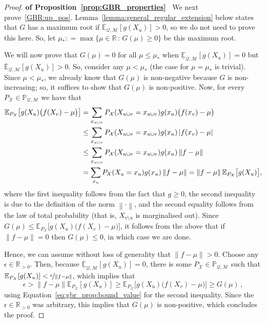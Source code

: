\documentclass[twoside,11pt]{article}
\newcommand{\reals}{\mathbb{R}}
\newcommand{\realspos}{\reals_{>0}}
\newcommand{\states}{\mathcal{X}}
\newcommand{\lexp}{\underline{\mathbb{E}}_{\rateset,\mathcal{M}}}
\newcommand{\uexp}{\overline{\mathbb{E}}_{\rateset,\mathcal{M}}}
\newcommand{\rateset}{\mathcal{Q}}
\newcommand{\norm}[1]{\left\lVert #1 \right\rVert}
\newcommand{\abs}[1]{\left\vert #1 \right\vert}
\newcommand{\coloneqq}{:\!=}
\begin{document}
\begin{proof}{\bf of Proposition~\ref{prop:GBR_properties}~}
We next prove~\ref{GBR:up_pos}. Lemma~\ref{lemma:general_regular_extension} below states that $G$ has a maximum root if $\uexp[g(X_u)]>0$, so we do not need to prove this here. So, let $\mu_*\coloneqq \max\{\mu\in\reals\,:\,G(\mu)\geq 0\}$ be this maximum root.

We will now prove that $G(\mu)=0$ for all $\mu\leq\mu_*$ when $\lexp[g(X_u)]=0$ but $\uexp[g(X_u)]>0$. So, consider any $\mu<\mu_*$ (the case for $\mu=\mu_*$ is trivial). Since $\mu<\mu_*$, we already know that $G(\mu)$ is non-negative because $G$ is non-increasing; so, it suffices to show that $G(\mu)$ is non-positive. Now, for every $P_\states\in\mathbb{P}_{\rateset,\mathcal{M}}$ we have that
\begin{align}
\mathbb{E}_{P_\states}\bigl[g(X_u)\bigl(f(X_v) - \mu\bigr)\bigr] 
&= \sum_{x_{u\cup v}} P_\states(X_{u\cup v}=x_{u\cup v})g(x_u)\bigl(f(x_v)-\mu\bigr) \notag\\
 &\leq \sum_{x_{u\cup v}} P_\states(X_{u\cup v}=x_{u\cup v})g(x_u)\abs{f(x_v)-\mu} \notag\\
 &\leq \sum_{x_{u\cup v}} P_\states(X_{u\cup v}=x_{u\cup v})g(x_u)\norm{f-\mu} \notag\\
 &= \sum_{x_{u}} P_\states(X_{u}=x_{u})g(x_u)\norm{f-\mu}= \norm{f-\mu}\mathbb{E}_{P_\states}\bigl[g(X_u)\bigr],
\label{eq:gbr_prop:bound_value}
\end{align}
where the first inequality follows from the fact that $g\geq 0$, the second inequality is due to the definition of the norm $\norm{\cdot}$, and the second equality follows from the law of total probability (that is, $X_{v\setminus u}$ is marginalised out). Since $G(\mu)\leq \mathbb{E}_{P_\states}\bigl[g(X_u)\bigl(f(X_v) - \mu\bigr)\bigr]$, it follows from the above that if $\norm{f-\mu}=0$ then $G(\mu)\leq 0$, in which case we are done. 

Hence, we can assume without loss of generality that $\norm{f-\mu}>0$. Choose any $\epsilon\in\realspos$. Then, because $\lexp[g(X_u)]=0$, there is some $P_\states\in\mathbb{P}_{\rateset,\mathcal{M}}$ such that $\mathbb{E}_{P_\states}[g(X_u)] < \nicefrac{\epsilon}{\norm{f-\mu}}$, which implies that
\begin{equation*}
\epsilon > \norm{f-\mu}\mathbb{E}_{P_\states}[g(X_u)] \geq \mathbb{E}_{P_\states}\bigl[g(X_u)\bigl(f(X_v) - \mu\bigr)\bigr] \geq G(\mu)\,,
\end{equation*}
using Equation~\eqref{eq:gbr_prop:bound_value} for the second inequality. Since the $\epsilon\in\realspos$ was arbitrary, this implies that $G(\mu)$ is non-positive, which concludes the proof.


\end{proof}
\end{document}
